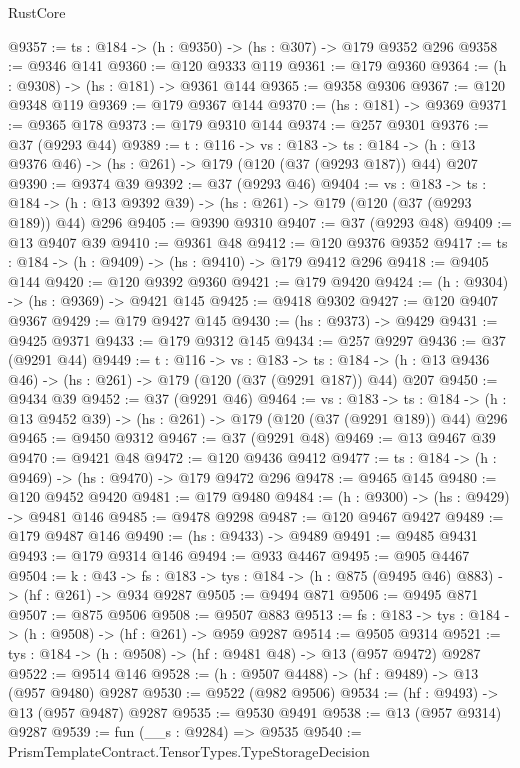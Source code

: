 \begin{lexlean}{RustCore}
\begin{coremodule}
@9357 := {ts : @184} -> (h : @9350) -> (hs : @307) -> @179 @9352 @296
@9358 := @9346 @141
@9360 := @120 @9333 @119
@9361 := @179 @9360
@9364 := (h : @9308) -> (hs : @181) -> @9361 @144
@9365 := @9358 @9306
@9367 := @120 @9348 @119
@9369 := @179 @9367 @144
@9370 := (hs : @181) -> @9369
@9371 := @9365 @178
@9373 := @179 @9310 @144
@9374 := @257 @9301
@9376 := @37 (@9293 @44)
@9389 := {t : @116} ->
  {vs : @183} ->
  {ts : @184} -> (h : @13 @9376 @46) -> (hs : @261) -> @179 (@120 (@37 (@9293 @187)) @44) @207
@9390 := @9374 @39
@9392 := @37 (@9293 @46)
@9404 := {vs : @183} ->
  {ts : @184} -> (h : @13 @9392 @39) -> (hs : @261) -> @179 (@120 (@37 (@9293 @189)) @44) @296
@9405 := @9390 @9310
@9407 := @37 (@9293 @48)
@9409 := @13 @9407 @39
@9410 := @9361 @48
@9412 := @120 @9376 @9352
@9417 := {ts : @184} -> (h : @9409) -> (hs : @9410) -> @179 @9412 @296
@9418 := @9405 @144
@9420 := @120 @9392 @9360
@9421 := @179 @9420
@9424 := (h : @9304) -> (hs : @9369) -> @9421 @145
@9425 := @9418 @9302
@9427 := @120 @9407 @9367
@9429 := @179 @9427 @145
@9430 := (hs : @9373) -> @9429
@9431 := @9425 @9371
@9433 := @179 @9312 @145
@9434 := @257 @9297
@9436 := @37 (@9291 @44)
@9449 := {t : @116} ->
  {vs : @183} ->
  {ts : @184} -> (h : @13 @9436 @46) -> (hs : @261) -> @179 (@120 (@37 (@9291 @187)) @44) @207
@9450 := @9434 @39
@9452 := @37 (@9291 @46)
@9464 := {vs : @183} ->
  {ts : @184} -> (h : @13 @9452 @39) -> (hs : @261) -> @179 (@120 (@37 (@9291 @189)) @44) @296
@9465 := @9450 @9312
@9467 := @37 (@9291 @48)
@9469 := @13 @9467 @39
@9470 := @9421 @48
@9472 := @120 @9436 @9412
@9477 := {ts : @184} -> (h : @9469) -> (hs : @9470) -> @179 @9472 @296
@9478 := @9465 @145
@9480 := @120 @9452 @9420
@9481 := @179 @9480
@9484 := (h : @9300) -> (hs : @9429) -> @9481 @146
@9485 := @9478 @9298
@9487 := @120 @9467 @9427
@9489 := @179 @9487 @146
@9490 := (hs : @9433) -> @9489
@9491 := @9485 @9431
@9493 := @179 @9314 @146
@9494 := @933 @4467
@9495 := @905 @4467
@9504 := {k : @43} ->
  {fs : @183} -> {tys : @184} -> (h : @875 (@9495 @46) @883) -> (hf : @261) -> @934 @9287
@9505 := @9494 @871
@9506 := @9495 @871
@9507 := @875 @9506
@9508 := @9507 @883
@9513 := {fs : @183} -> {tys : @184} -> (h : @9508) -> (hf : @261) -> @959 @9287
@9514 := @9505 @9314
@9521 := {tys : @184} -> (h : @9508) -> (hf : @9481 @48) -> @13 (@957 @9472) @9287
@9522 := @9514 @146
@9528 := (h : @9507 @4488) -> (hf : @9489) -> @13 (@957 @9480) @9287
@9530 := @9522 (@982 @9506)
@9534 := (hf : @9493) -> @13 (@957 @9487) @9287
@9535 := @9530 @9491
@9538 := @13 (@957 @9314) @9287
@9539 := fun (__s : @9284) => @9535
@9540 := PrismTemplateContract.TensorTypes.TypeStorageDecision

\end{coremodule}
\end{lexlean}

